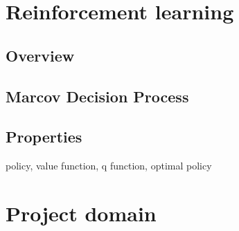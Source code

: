 \documentclass[12pt]{article}
\begin{document}

\tableofcontents
\pagebreak


\section{Reinforcement learning}{

}
\subsection{Overview}{

}
\subsection{Marcov Decision Process}{

}
\subsection{Properties}{policy, value function, q function, optimal policy}
\newpage
\section{Project domain} 
\end{document}
